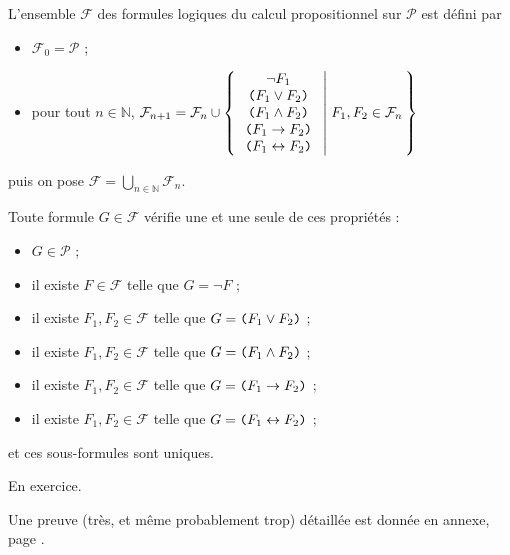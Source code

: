 \documentclass[./main]{subfiles}
\begin{document}
  \begin{defn}
    L'ensemble $\mathcal{F}$ des formules logiques du calcul propositionnel sur $\mathcal{P}$ est défini par 
    \begin{itemize}
      \item $\mathcal{F}_0 = \mathcal{P}$ ;
      \item pour tout $n \in \mathbb N$, $\mathcal{F}_{n+1} = \mathcal{F}_n \cup \mleft\{\, 
          \begin{array}{c}
            \lnot F_1\\
            \verb|(| F_1 \lor F_2 \verb|)|\\
            \verb|(| F_1 \land F_2 \verb|)|\\
            \verb|(| F_1 \to F_2 \verb|)|\\
            \verb|(| F_1 \leftrightarrow F_2 \verb|)|
          \end{array}
        \;\middle|\; F_1, F_2 \in \mathcal{F}_n \,\mright\}  $
    \end{itemize}
    puis on pose $\mathcal{F} = \bigcup_{n \in \mathds{N}} \mathcal{F}_n$.
  \end{defn}

  \begin{thm}
    Toute formule $G \in \mathcal{F}$ vérifie une et une seule de ces propriétés :
    \begin{itemize}
      \item $G \in \mathcal{P}$ ;
      \item il existe $F \in \mathcal{F}$ telle que $G = \lnot F$ ;
      \item il existe $F_1, F_2 \in \mathcal{F}$ telle que $G = \verb|(| F_1 \lor F_2 \verb|)|$ ;
      \item il existe $F_1, F_2 \in \mathcal{F}$ telle que $G = \verb|(| F_1 \land F_2 \verb|)|$ ;
      \item il existe $F_1, F_2 \in \mathcal{F}$ telle que $G = \verb|(| F_1 \to F_2 \verb|)|$ ;
      \item il existe $F_1, F_2 \in \mathcal{F}$ telle que $G = \verb|(| F_1 \leftrightarrow F_2 \verb|)|$ ;
    \end{itemize}
    et ces sous-formules sont uniques.
    \label{lem:lecture-unique}
  \end{thm}
  \begin{prv}
    En exercice.

    Une preuve (très, et même probablement trop) détaillée est donnée en annexe, page \pageref{sect:annexe-lem-lecture-unique}.
  \end{prv}
\end{document}
